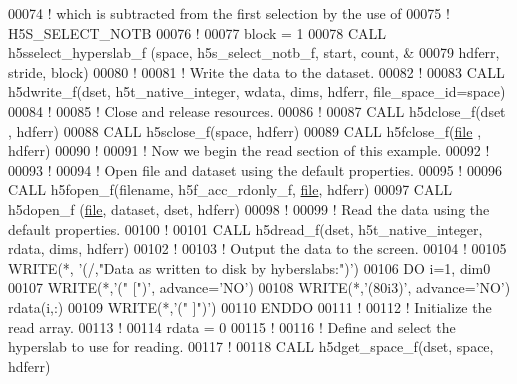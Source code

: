 \begin{DoxyCode}
00074   \textcolor{comment}{! which is subtracted from the first selection by the use of}
00075   \textcolor{comment}{! H5S\_SELECT\_NOTB}
00076   \textcolor{comment}{!}
00077   block = 1
00078   \textcolor{keyword}{CALL }h5sselect\_hyperslab\_f (space, h5s\_select\_notb\_f, start, count, &
00079        hdferr, stride, block)
00080   \textcolor{comment}{!}
00081   \textcolor{comment}{! Write the data to the dataset.}
00082   \textcolor{comment}{!}
00083   \textcolor{keyword}{CALL }h5dwrite\_f(dset, h5t\_native\_integer, wdata, dims, hdferr, file\_space\_id=space)
00084   \textcolor{comment}{!}
00085   \textcolor{comment}{! Close and release resources.}
00086   \textcolor{comment}{!}
00087   \textcolor{keyword}{CALL }h5dclose\_f(dset , hdferr)
00088   \textcolor{keyword}{CALL }h5sclose\_f(space, hdferr)
00089   \textcolor{keyword}{CALL }h5fclose\_f(\hyperlink{structfile}{file} , hdferr)
00090   \textcolor{comment}{!}
00091   \textcolor{comment}{! Now we begin the read section of this example.}
00092   \textcolor{comment}{!}
00093   \textcolor{comment}{!}
00094   \textcolor{comment}{! Open file and dataset using the default properties.}
00095   \textcolor{comment}{!}
00096   \textcolor{keyword}{CALL }h5fopen\_f(filename, h5f\_acc\_rdonly\_f, \hyperlink{structfile}{file}, hdferr)
00097   \textcolor{keyword}{CALL }h5dopen\_f (\hyperlink{structfile}{file}, dataset, dset, hdferr)
00098   \textcolor{comment}{!}
00099   \textcolor{comment}{! Read the data using the default properties.}
00100   \textcolor{comment}{!}
00101   \textcolor{keyword}{CALL }h5dread\_f(dset, h5t\_native\_integer, rdata, dims, hdferr)
00102   \textcolor{comment}{!}
00103   \textcolor{comment}{! Output the data to the screen.}
00104   \textcolor{comment}{!}
00105   \textcolor{keyword}{WRITE}(*, \textcolor{stringliteral}{'(/,"Data as written to disk by hyberslabs:")'})
00106   \textcolor{keywordflow}{DO} i=1, dim0
00107      \textcolor{keyword}{WRITE}(*,\textcolor{stringliteral}{'(" [")'}, advance=\textcolor{stringliteral}{'NO'})
00108      \textcolor{keyword}{WRITE}(*,\textcolor{stringliteral}{'(80i3)'}, advance=\textcolor{stringliteral}{'NO'}) rdata(i,:)
00109      \textcolor{keyword}{WRITE}(*,\textcolor{stringliteral}{'(" ]")'})
00110 \textcolor{keywordflow}{  ENDDO}
00111   \textcolor{comment}{!}
00112   \textcolor{comment}{! Initialize the read array.}
00113   \textcolor{comment}{!}
00114   rdata = 0
00115   \textcolor{comment}{!}
00116   \textcolor{comment}{! Define and select the hyperslab to use for reading.}
00117   \textcolor{comment}{!}
00118   \textcolor{keyword}{CALL }h5dget\_space\_f(dset, space, hdferr)

\end{DoxyCode}
